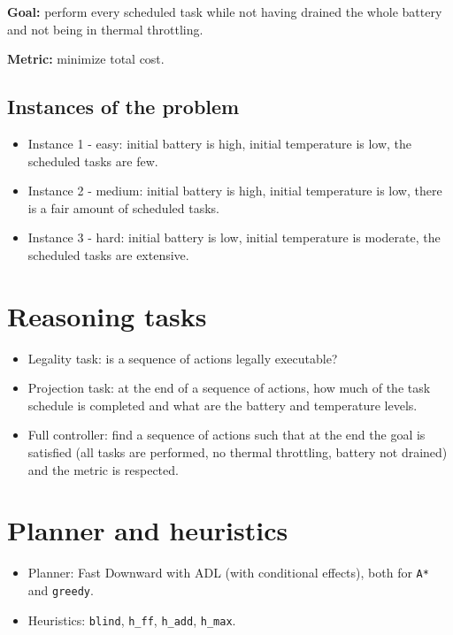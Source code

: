 \documentclass[12pt]{article}
\begin{document}
\par\noindent\textbf{Goal:} perform every scheduled task while not having drained the whole battery and not being in thermal throttling.

\par\noindent\textbf{Metric:} minimize total cost.

\subsection{Instances of the problem}

\begin{itemize}
    \item Instance 1 - easy: initial battery is high, initial temperature is low, the scheduled tasks are few.
    \item Instance 2 - medium: initial battery is high, initial temperature is low, there is a fair amount of scheduled tasks.
    \item Instance 3 - hard: initial battery is low, initial temperature is moderate, the scheduled tasks are extensive.
\end{itemize}

\section{Reasoning tasks}
\begin{itemize}
    \item Legality task: is a sequence of actions legally executable? 
    \item Projection task: at the end of a sequence of actions, how much of the task schedule is completed and what are the battery and temperature levels.
    \item Full controller: find a sequence of actions such that at the end the goal is satisfied (all tasks are performed, no thermal throttling, battery not drained) and the metric is respected.
\end{itemize}

\section{Planner and heuristics}
\begin{itemize}
    \item Planner: Fast Downward with ADL (with conditional effects), both for \verb|A*| and \verb|greedy|.
    \item Heuristics: \verb|blind|, \verb|h_ff|, \verb|h_add|, \verb|h_max|.
\end{itemize}
\end{document}
